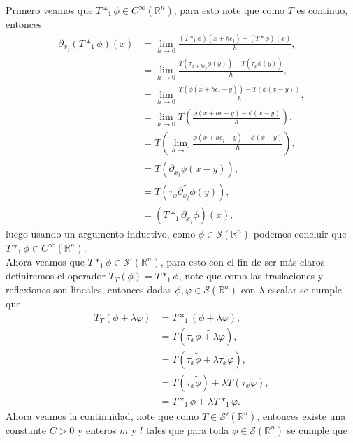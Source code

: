 \begin{homeworkProblem}
\begin{solution}
    Primero veamos que $T*_{1}\phi\in C^{\infty}(\mathbb{R}^{n})$, para esto note que como $T$ es continuo, entonces 
      \begin{align*}
        \partial_{x_j}\left(T*_{1}\phi\right)(x)&=\lim_{h\rightarrow 0}\frac{(T*_{1}\phi)(x+h\epsilon_j)-(T*\phi)(x)}{h},\\
        &=\lim_{h \to 0}\frac{T\left( \tau_{x+h\epsilon_{j}}\tilde{\phi}(y)\right)-T\left( \tau_{x}\tilde{\phi}(y) \right)}{h},\\
        &=\lim_{h\rightarrow 0}\frac{T\left( \phi\left( x+h\epsilon_{j}-y \right) \right)-T\left( \phi\left( x-y \right) \right)}{h},\\
        &=\lim_{h \to 0}T\left( \frac{\phi(x+h\epsilon-y)-\phi(x-y)}{h} \right),\\
        &=T\left( \lim_{h \to 0}\frac{\phi(x+h\epsilon_{j}-y)-\phi(x-y)}{h}\right),\\
        &=T\left( \partial_{x_{j}}\phi(x-y) \right),\\
        &=T\left( \tau_{x}\tilde{\partial_{x_j}\phi}(y) \right),\\
        &= \left(T*_{1}\partial_{x_j}\phi\right)(x),
      \end{align*}
      luego usando un argumento inductivo, como $\phi\in\mathcal{S}(\mathbb{R}^{n})$ podemos concluir que $T*_{1}\phi\in C^{\infty}(\mathbb{R}^{n})$.\\
      Ahora veamos que $T*_{1}\phi\in\mathcal{S}'(\mathbb{R}^{n})$, para esto con el fin de ser más claros definiremos el operador $T_{T}(\phi)=T*_{1}\phi$, note que como las traslaciones y reflexiones son lineales, entonces dadas $\phi,\varphi\in\mathcal{S}(\mathbb{R}^{n})$ con $\lambda$ escalar se cumple que
      \begin{align*}
        T_{T}(\phi+\lambda\varphi)&=T*_{1}\left( \phi+\lambda\varphi \right),\\
        &=T\left( \tau_{x}\tilde{\phi+\lambda\varphi} \right),\\
        &=T\left( \tau_{x}\tilde{\phi}+\lambda\tau_{x}\tilde{\varphi} \right),\\
        &=T\left( \tau_{x}\tilde{\phi} \right)+\lambda T\left( \tau_{x}\tilde{\varphi} \right),\\
        &=T*_{1}\phi+\lambda T*_{1}\varphi.
      \end{align*}
      Ahora veamos la continuidad, note que como $T\in\mathcal{S}'(\mathbb{R}^{n})$, entonces existe una constante $C>0$ y enteros $m$ y $l$ tales que para toda $\phi\in \mathcal{S}(\mathbb{R}^{n})$ se cumple que

\end{solution}
\end{homeworkProblem}
